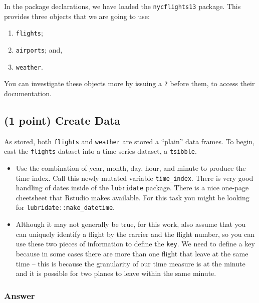 \documentclass[
]{article}
\providecommand{\tightlist}{%
  \setlength{\itemsep}{0pt}\setlength{\parskip}{0pt}}
\begin{document}
In the package declarations, we have loaded the \texttt{nycflights13}
package. This provides three objects that we are going to use:

\begin{enumerate}
\def\labelenumi{\arabic{enumi}.}
\tightlist
\item
  \texttt{flights};
\item
  \texttt{airports}; and,
\item
  \texttt{weather}.
\end{enumerate}

You can investigate these objects more by issuing a \texttt{?} before
them, to access their documentation.

\newpage

\subsection{(1 point) Create Data}\label{point-create-data}

As stored, both \texttt{flights} and \texttt{weather} are stored a
``plain'' data frames. To begin, cast the \texttt{flights} dataset into
a time series dataset, a \texttt{tsibble}.

\begin{itemize}
\tightlist
\item
  Use the combination of year, month, day, hour, and minute to produce
  the time index. Call this newly mutated variable \texttt{time\_index}.
  There is very good handling of dates inside of the \texttt{lubridate}
  package. There is a nice one-page cheetsheet that Rstudio makes
  available. For this task you might be looking for
  \texttt{lubridate::make\_datetime}.
\item
  Although it may not generally be true, for this work, also assume that
  you can uniquely identify a flight by the carrier and the flight
  number, so you can use these two pieces of information to define the
  \texttt{key}. We need to define a key because in some cases there are
  more than one flight that leave at the same time -- this is because
  the granularity of our time measure is at the minute and it is
  possible for two planes to leave within the same minute.
\end{itemize}

\subsubsection{Answer}\label{answer}
\end{document}
